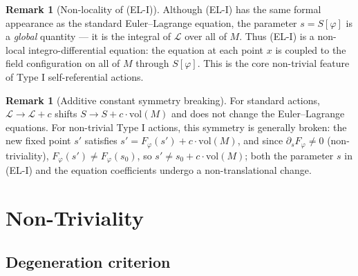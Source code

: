 \documentclass[12pt,letterpaper]{article}
\theoremstyle{definition}
\newtheorem{remark}[theorem]{Remark}
\newcommand{\mL}{\mathcal{L}}
\newcommand{\vol}{\mathrm{vol}}
\begin{document}
\begin{remark}[Non-locality of (EL-I)]
Although (EL-I) has the same formal appearance as the standard Euler--Lagrange equation, the parameter $s = S[\varphi]$ is a \emph{global} quantity --- it is the integral of $\mL$ over all of $M$. Thus (EL-I) is a non-local integro-differential equation: the equation at each point $x$ is coupled to the field configuration on all of $M$ through $S[\varphi]$. This is the core non-trivial feature of Type I self-referential actions.
\end{remark}

\begin{remark}[Additive constant symmetry breaking]
\label{rem:additive}
For standard actions, $\mL \to \mL + c$ shifts $S \to S + c \cdot \vol(M)$ and does not change the Euler--Lagrange equations. For non-trivial Type I actions, this symmetry is generally broken: the new fixed point $s'$ satisfies $s' = F_\varphi(s') + c \cdot \vol(M)$, and since $\partial_s F_\varphi \neq 0$ (non-triviality), $F_\varphi(s') \neq F_\varphi(s_0)$, so $s' \neq s_0 + c \cdot \vol(M)$; both the parameter $s$ in (EL-I) and the equation coefficients undergo a non-translational change.
\end{remark}

\section{Non-Triviality}
\label{sec:nontriv}

\subsection{Degeneration criterion}
\end{document}
